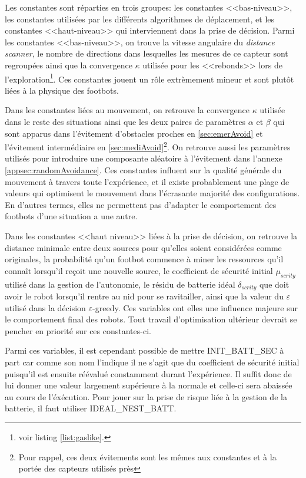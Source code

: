 Les constantes sont réparties en trois groupes: les constantes <<bas-niveau>>, les constantes utilisées par les différents algorithmes de déplacement, et les constantes <<haut-niveau>> qui interviennent dans la prise de décision. Parmi les constantes <<bas-niveau>>, on trouve la vitesse angulaire du \emph{distance scanner}, le nombre de directions dans lesquelles les mesures de ce capteur sont regroupées ainsi que la convergence $\kappa$ utilisée pour les <<rebonds>> lors de l'exploration\footnote{voir listing \ref{list:gaslike}.}. Ces constantes jouent un rôle extrèmement mineur et sont plutôt liées à la physique des footbots.

Dans les constantes liées au mouvement, on retrouve la convergence $\kappa$ utilisée dans le reste des situations ainsi que les deux paires de paramètres $\alpha$ et $\beta$ qui sont apparus dans l'évitement d'obstacles proches en \ref{sec:emerAvoid} et l'évitement intermédiaire en \ref{sec:mediAvoid}\footnote{Pour rappel, ces deux évitements sont les mêmes aux constantes et à la portée des capteurs utilisés près}. On retrouve aussi les paramètres utilisés pour introduire une composante aléatoire à l'évitement dans l'annexe \ref{appsec:randomAvoidance}. Ces constantes influent sur la qualité générale du mouvement à travers toute l'expérience, et il existe probablement une plage de valeurs qui optimisent le mouvement dans l'écrasante majorité des configurations. En d'autres termes, elles ne permettent pas d'adapter le comportement des footbots d'une situation a une autre.

Dans les constantes <<haut niveau>> liées à la prise de décision, on retrouve la distance minimale entre deux sources pour qu'elles soient considérées comme originales, la probabilité qu'un footbot commence à miner les ressources qu'il connaît lorsqu'il reçoit une nouvelle source, le coefficient de sécurité initial $\mu_{scrity}$ utilisé dans la gestion de l'autonomie, le résidu de batterie idéal $\delta_{scrity}$ que doit avoir le robot lorsqu'il rentre au nid pour se ravitailler, ainsi que la valeur du $\varepsilon$ utilisé dans la décision $\varepsilon$-greedy. Ces variables ont elles une influence majeure sur le comportement final des robots. Tout travail d'optimisation ultérieur devrait se pencher en priorité sur ces constantes-ci.

Parmi ces variables, il est cependant possible de mettre {\ttfamily INIT\_BATT\_SEC} à part car comme son nom l'indique il ne s'agit que du coefficient de sécurité initial puisqu'il est ensuite réévalué constamment durant l'expérience. Il suffit donc de lui donner une valeur largement supérieure à la normale et celle-ci sera abaissée au cours de l'éxécution. Pour jouer sur la prise de risque liée à la gestion de la batterie, il faut utiliser {\ttfamily IDEAL\_NEST\_BATT}.

